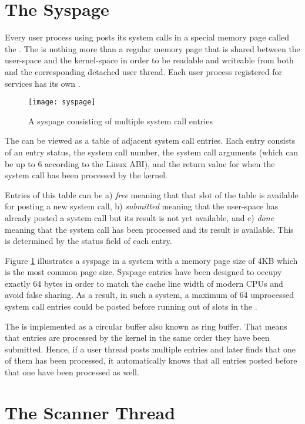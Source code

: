 \section{The Syspage}

Every user process using \memsc posts its system calls in a special memory page
called the \emph{\sysp}. The \sysp is nothing more than a regular memory page
that is shared between the user-space and the kernel-space in order to be
readable and writeable from both \llinux and the corresponding detached user
thread. Each user process registered for \memsc services has its own \sysp.

\begin{figure}[h]
\centering
\texttt{[image: syspage]}
\caption{A syspage consisting of multiple system call entries}
\label{fig:syspage}
\end{figure}

The \sysp can be viewed as a table of adjacent system call entries. Each entry
consists of an entry status, the system call number, the system call arguments
(which can be up to 6 according to the Linux ABI), and the return value for
when the system call has been processed by the kernel.

Entries of this table can be a) \emph{free} meaning that that slot of the table
is available for posting a new system call, b) \emph{submitted} meaning that
the user-space has already posted a system call but its result is not yet
available, and c) \emph{done} meaning that the system call has been processed
and its result is available. This is determined by the status field of each
entry.

Figure \ref{fig:syspage} illustrates a syspage in a system with a memory page
size of 4KB which is the most common page size. Syspage entries have been
designed to occupy exactly 64 bytes in order to match the cache line width of
modern CPUs and avoid false sharing. As a result, in such a system, a maximum
of 64 unprocessed system call entries could be posted before running out of
slots in the \sysp.

The \sysp is implemented as a circular buffer also known as ring buffer. That
means that entries are processed by the kernel in the same order they have been
submitted. Hence, if a user thread posts multiple entries and later finds that
one of them has been processed, it automatically knows that all entries posted
before that one have been processed as well.

\section{The Scanner Thread}

